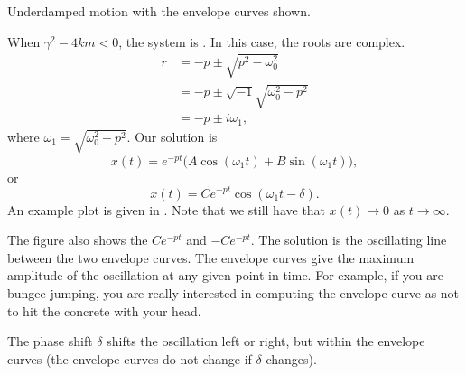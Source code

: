 \documentclass{ximera}
\begin{document}
\begin{mywrapfig}[15]{3.25in}
    \capstart
    \caption{Underdamped motion with the envelope curves shown.\label{mv:underdampedfig}}
\end{mywrapfig}
%
%
When $\gamma^2 - 4km < 0$, the system is \emph{}. In this case, the roots are complex.
\begin{equation*}
    \begin{split}
        r & = -p \pm \sqrt{p^2 - \omega_0^2} \\
        & = -p \pm \sqrt{-1}\sqrt{\omega_0^2 - p^2} \\
        & = -p \pm i \omega_1 ,
    \end{split}
\end{equation*}
where $\omega_1 =\sqrt{\omega_0^2 - p^2}$.  Our solution is
\begin{equation*}
    x(t) = e^{-pt} \bigl( A \cos (\omega_1 t) + B \sin (\omega_1 t) \bigr) ,
\end{equation*}
or
\begin{equation*}
    x(t) = C e^{-pt} \cos ( \omega_1 t - \delta ) .
\end{equation*}
An example plot is given in .  Note that we still have that $x(t) \to 0$ as $t \to \infty$.


The figure also shows the \emph{} $C e^{-pt}$ and $-C e^{-pt}$.  The solution is the oscillating line between the two envelope curves. The envelope curves give the maximum amplitude of the oscillation at any given point in time.  For example, if you are bungee jumping, you are really interested in computing the envelope curve as not to hit the concrete with your head.

The phase shift $\delta$ shifts the oscillation left or right, but within the envelope curves (the envelope curves do not change if $\delta$ changes).
\end{document}
